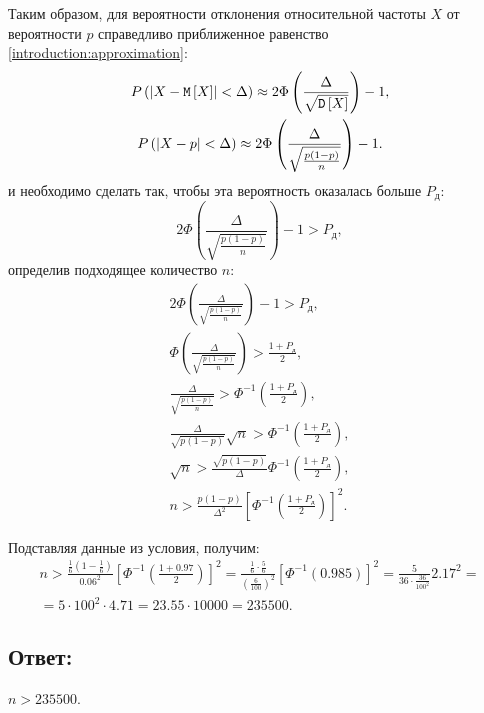 Таким образом, для вероятности отклонения относительной частоты $X$ от вероятности $p$ справедливо приближенное равенство \eqref{introduction:approximation}:
\begin{gather}
    P \left ( \left | X - \mathtt{M} \left [ X \right ] \right | < \Delta \right ) \approx 2 \Phi \left ( \frac{\Delta}{\sqrt{\mathtt{D} \left [ X \right ]}} \right ) - 1 , \\
    P \left ( \left | X - p \right | < \Delta \right ) \approx 2 \Phi \left ( \frac{\Delta}{\sqrt{\frac{p(1-p)}{n}}} \right ) - 1 .
\end{gather}
и необходимо сделать так, чтобы эта вероятность оказалась больше $P_\text{д}$:
\begin{equation}
    2 \Phi \left ( \frac{\Delta}{\sqrt{\frac{p(1-p)}{n}}} \right ) - 1 > P_\text{д} ,
\end{equation}
определив подходящее количество $n$:
\begin{gather}
    2 \Phi \left ( \frac{\Delta}{\sqrt{\frac{p(1-p)}{n}}} \right ) - 1 > P_\text{д} , \\
    \Phi \left ( \frac{\Delta}{\sqrt{\frac{p(1-p)}{n}}} \right ) > \frac{1 + P_\text{д}}{2} , \\
    \frac{\Delta}{\sqrt{\frac{p(1-p)}{n}}} > \Phi^{-1} \left ( \frac{1 + P_\text{д}}{2} \right ) , \\
    \frac{\Delta}{\sqrt{p(1-p)}} \sqrt{n} > \Phi^{-1} \left ( \frac{1 + P_\text{д}}{2} \right ) , \\
    \sqrt{n} > \frac{\sqrt{p(1-p)}}{\Delta} \Phi^{-1} \left ( \frac{1 + P_\text{д}}{2} \right ) , \\
    n > \frac{p(1-p)}{\Delta^2} \left [ \Phi^{-1} \left ( \frac{1 + P_\text{д}}{2} \right ) \right ]^2 .
\end{gather}

Подставляя данные из условия, получим:
\begin{multline}
    n >
    \frac{\frac{1}{6} \left ( 1 - \frac{1}{6} \right )}{0.06^2} \left [ \Phi^{-1} \left ( \frac{1 + 0.97}{2} \right ) \right ]^2
    = \frac{\frac{1}{6} \cdot \frac{5}{6}}{\left ( \frac{6}{100} \right )^2} \left [ \Phi^{-1} \left ( 0.985 \right ) \right ]^2
    = \frac{5}{36 \cdot \frac{36}{100^2}} 2.17^2 = \\
    = 5 \cdot 100^2 \cdot 4.71
    = 23.55 \cdot 10000
    = 235500 .
\end{multline}
\subsection*{Ответ:}
$n > 235500$.

